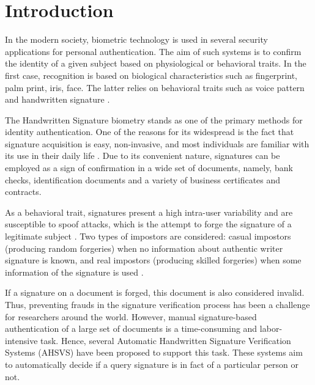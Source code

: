 
\chapter{Introduction}

In the modern society, biometric technology is used in several security applications for personal authentication. The aim of such systems is to confirm the identity of a given subject based on physiological or behavioral traits. In the first case, recognition is based on biological characteristics such as fingerprint, palm print, iris, face. The latter relies on behavioral traits such as voice pattern and handwritten signature \cite{jain2004biometrics}.

The Handwritten Signature biometry stands as one of the primary methods for identity authentication. One of the reasons for its widespread is the fact that signature acquisition is easy, non-invasive, and most individuals are familiar with its use in their daily life \cite{impedovo2008state}. Due to its convenient nature, signatures can be employed as a sign of confirmation in a wide set of documents, namely, bank checks, identification documents and a variety of business certificates and contracts.

As a behavioral trait, signatures present a high intra-user variability and are susceptible to spoof attacks, which is the attempt to forge the signature of a legitimate subject \cite{jain2004biometrics}. Two types of impostors are considered: casual impostors (producing random forgeries) when no information about authentic writer signature is known, and real impostors (producing skilled forgeries) when some information of the signature is used \cite{fierrez2008handbook}.

If a signature on a document is forged, this document is also considered invalid. Thus, preventing frauds in the signature verification process has been a challenge for researchers around the world. However, manual signature-based authentication of a large set of documents is a time-consuming and labor-intensive task. Hence, several Automatic Handwritten Signature Verification Systems (AHSVS) have been proposed to support this task. These systems aim to automatically decide if a query signature is in fact of a particular person or not.

